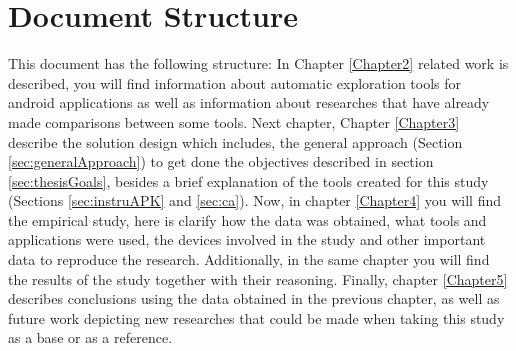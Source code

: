 \section{Document Structure}

This document has the following structure: In Chapter \ref{Chapter2} related work is described, you will find information about automatic exploration tools for android applications as well as information about researches that have already made comparisons between some tools. Next chapter, Chapter \ref{Chapter3} describe the solution design which includes, the general approach (Section \ref{sec:generalApproach}) to get done the objectives described in section \ref{sec:thesisGoals}, besides a brief explanation of the tools created for this study (Sections \ref{sec:instruAPK} and \ref{sec:ca}). Now, in chapter \ref{Chapter4} you will find the empirical study, here is clarify how the data was obtained, what tools and applications were used, the devices involved in the study and other important data to reproduce the research. Additionally, in the same chapter you will find the results of the study together with their reasoning. Finally, chapter \ref{Chapter5} describes conclusions using the data obtained in the previous chapter, as well as future work depicting new researches that could be made when taking this study as a base or as a reference.

